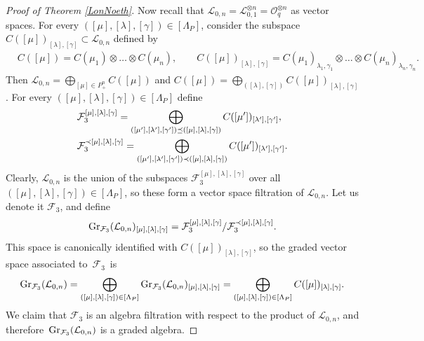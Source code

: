 \documentclass[pdftex]{sigma}
\numberwithin{equation}{section}
\theoremstyle{definition}
\newcommand{\Ll}{{\mathcal L}}
\begin{document}
\begin{proof}[Proof of Theorem \ref{LonNoeth}]
Now recall that $\Ll_{0,n} = {\mathcal L}_{0,1}^{\otimes n} = {\mathcal O}_q^{\otimes n}$ as vector spaces. For every $([\mu],[\lambda],[\gamma])\in[\Lambda_P]$, consider the subspace $C([\mu])_{[\lambda],[\gamma]}\subset \Ll_{0,n}$ defined by
\begin{align*}
&C([\mu]) =C(\mu_1)\otimes \dots \otimes C(\mu_n),\qquad
C([\mu])_{[\lambda],[\gamma]}=C(\mu_1)_{\lambda_1,\gamma_1}\otimes \dots \otimes C(\mu_n)_{\lambda_n,\gamma_n}.
\end{align*}
Then $ {\mathcal L}_{0,n}=\bigoplus_{[\mu]\in P_+^n} C({[\mu]})$ and $ C({[\mu]})=\bigoplus_{([\lambda],[\gamma])} C([\mu])_{[\lambda],[\gamma]}$. For every
$([\mu],[\lambda],[\gamma])\in [\Lambda_P]$ define
\begin{align}
&{\mathcal F}_3^{[\mu],[\lambda],[\gamma]} =\bigoplus_{([\mu'],[\lambda'],[\gamma'])\preceq ([\mu],[\lambda],[\gamma])} C([\mu'])_{[\lambda'],[\gamma']},\label{F2grad}\\
&{\mathcal F}_3^{\prec [\mu],[\lambda],[\gamma]} =\bigoplus_{([\mu'],[\lambda'],[\gamma'])\prec ([\mu],[\lambda],[\gamma])} C([\mu'])_{[\lambda'],[\gamma']}.\notag
\end{align}
Clearly, $\Ll_{0,n}$ is the union of the subspaces ${\mathcal F}_3^{[\mu],[\lambda],[\gamma]}$ over all $([\mu],[\lambda],[\gamma])\in [\Lambda_P]$, so these form a vector space filtration of $\Ll_{0,n}$. Let us denote it ${\mathcal F}_3$, and define
\[{\rm Gr}_{{\mathcal F}_3}({\mathcal L}_{0,n})_{[\mu],[\lambda],[\gamma]} = {\mathcal F}_3^{[\mu],[\lambda],[\gamma]}/{\mathcal F}_3^{\prec [\mu],[\lambda],[\gamma]}.\]
This space is canonically identified with $C({[\mu]})_{[\lambda],[\gamma]}$, so the graded vector space associated to~$\mathcal{F}_3$~is%
\begin{equation}\label{decompgrad}
{\rm Gr}_{{\mathcal F}_3}({\mathcal L}_{0,n}) = \bigoplus_{([\mu],[\lambda],[\gamma])\in [\Lambda_P]} {\rm Gr}_{{\mathcal F}_3}({\mathcal L}_{0,n})_{[\mu],[\lambda],[\gamma]} = \bigoplus_{([\mu],[\lambda],[\gamma])\in [\Lambda_P]} C({[\mu]})_{[\lambda],[\gamma]}.
\end{equation}
 We claim that ${\mathcal F}_3$ is an algebra filtration with respect to the product of $\Ll_{0,n}$, and therefore~${{\rm Gr}_{{\mathcal F}_3}({\mathcal L}_{0,n})}$ is a graded algebra.


\end{proof}
\end{document}
